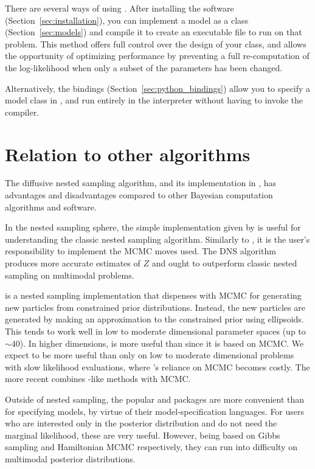 \documentclass[article]{jss}
\begin{document}
There are several ways of using . After installing the software
(Section~\ref{sec:installation}), you can implement a model as
a  class
(Section~\ref{sec:models}) and compile it to create an executable file
to run  on that problem. This method offers full control over the
design of your class, and allows the opportunity of optimizing
performance by preventing a full re-computation of the log-likelihood when
only a subset of the parameters has been changed.

Alternatively, the  \citep{python}
bindings (Section~\ref{sec:python_bindings}) allow you
to specify a model class in , and run  entirely
in the  interpreter without having to invoke the 
compiler.

\section{Relation to other algorithms}\label{sec:relation}
The diffusive nested sampling algorithm, and its implementation in
, has advantages and disadvantages compared to other Bayesian
computation algorithms and software.

In the nested sampling sphere,
the simple  implementation given by
\citet{skilling2006nested} is useful for understanding the classic nested sampling
algorithm. Similarly to , it is the user's responsibility
to implement the MCMC moves used. The DNS algorithm produces more
accurate estimates of $Z$ and ought to outperform classic nested sampling on multimodal
problems.

 \citep{feroz2009multinest} is a
nested sampling implementation
that dispenses with MCMC for generating new particles from constrained
prior distributions. Instead, the new particles are generated by making
an approximation to the constrained prior using ellipsoids. This tends to work
well in low to moderate dimensional parameter spaces (up to $\sim 40$).
In higher dimensions,  is more useful than 
since it is based on MCMC. We expect  to be more useful
than
 only on low to moderate dimensional problems with slow
likelihood evaluations, where 's reliance on MCMC becomes costly.
The more recent  \citep{handley2015polychord} combines
-like methods with MCMC.

Outside of nested sampling,
the popular  \citep{jags} and  \citep{stan} packages
are more convenient than  for specifying models, by virtue
of their model-specification languages. For users who are interested only
in the posterior distribution and do not need the marginal likelihood,
these are very useful.
However, being based on Gibbs
sampling and Hamiltonian MCMC respectively, they can run into difficulty
on multimodal posterior distributions.
\end{document}

